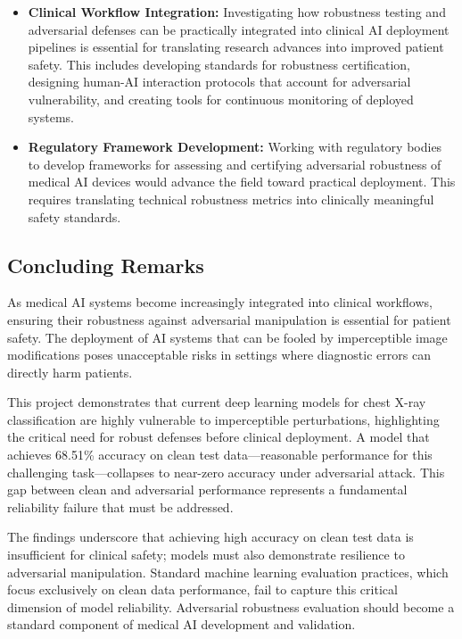\documentclass[12pt,a4paper]{article}
\begin{document}
\begin{itemize}[leftmargin=*]
    \item \textbf{Clinical Workflow Integration:} Investigating how robustness testing and adversarial defenses can be practically integrated into clinical AI deployment pipelines is essential for translating research advances into improved patient safety. This includes developing standards for robustness certification, designing human-AI interaction protocols that account for adversarial vulnerability, and creating tools for continuous monitoring of deployed systems.
    
    \item \textbf{Regulatory Framework Development:} Working with regulatory bodies to develop frameworks for assessing and certifying adversarial robustness of medical AI devices would advance the field toward practical deployment. This requires translating technical robustness metrics into clinically meaningful safety standards.
\end{itemize}

\subsection{Concluding Remarks}

As medical AI systems become increasingly integrated into clinical workflows, ensuring their robustness against adversarial manipulation is essential for patient safety. The deployment of AI systems that can be fooled by imperceptible image modifications poses unacceptable risks in settings where diagnostic errors can directly harm patients.

This project demonstrates that current deep learning models for chest X-ray classification are highly vulnerable to imperceptible perturbations, highlighting the critical need for robust defenses before clinical deployment. A model that achieves 68.51\% accuracy on clean test data---reasonable performance for this challenging task---collapses to near-zero accuracy under adversarial attack. This gap between clean and adversarial performance represents a fundamental reliability failure that must be addressed.

The findings underscore that achieving high accuracy on clean test data is insufficient for clinical safety; models must also demonstrate resilience to adversarial manipulation. Standard machine learning evaluation practices, which focus exclusively on clean data performance, fail to capture this critical dimension of model reliability. Adversarial robustness evaluation should become a standard component of medical AI development and validation.
\end{document}
